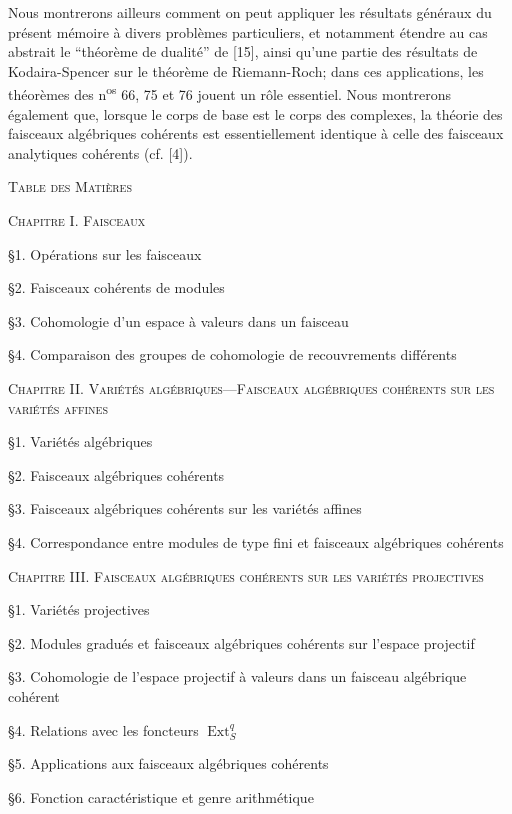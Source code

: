 Nous montrerons ailleurs comment on peut appliquer les résultats généraux du présent mémoire à divers problèmes particuliers, et notamment étendre au cas abstrait le ``théorème de dualité'' de [15], ainsi qu'une partie des résultats de Kodaira-Spencer sur le théorème de Riemann-Roch; dans ces applications, les théorèmes des n\textsuperscript{os} 66, 75 et 76 jouent un rôle essentiel. Nous montrerons également que, lorsque le corps de base est le corps des complexes, la théorie des faisceaux algébriques cohérents est essentiellement identique à celle des faisceaux analytiques cohérents (cf. [4]).


\textsc{Table des Matières}


\textsc{Chapitre I. Faisceaux}

\S1. Opérations sur les faisceaux

\S2. Faisceaux cohérents de modules

\S3. Cohomologie d'un espace à valeurs dans un faisceau

\S4. Comparaison des groupes de cohomologie de recouvrements différents


\textsc{Chapitre II. Variétés algébriques---Faisceaux algébriques cohérents sur les variétés affines}

\S1. Variétés algébriques

\S2. Faisceaux algébriques cohérents

\S3. Faisceaux algébriques cohérents sur les variétés affines

\S4. Correspondance entre modules de type fini et faisceaux algébriques cohérents




\textsc{Chapitre III. Faisceaux algébriques cohérents sur les variétés projectives}

\S1. Variétés projectives

\S2. Modules gradués et faisceaux algébriques cohérents sur l'espace projectif

\S3. Cohomologie de l'espace projectif à valeurs dans un faisceau algébrique cohérent

\S4. Relations avec les foncteurs $\operatorname{Ext}^q_S$

\S5. Applications aux faisceaux algébriques cohérents

\S6. Fonction caractéristique et genre arithmétique


